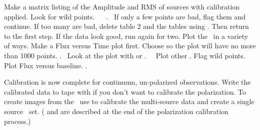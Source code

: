 \begin{description}
 Make a matrix listing of the Amplitude and RMS
   of  sources with calibration applied.  Look for
   wild points.~
~
.~
If only a few points are bad, flag them and continue.
If too many are bad, delete \CL table 2 and the \SN
tables using .
Then return to the first  step.
If the data look good, run  again for \IF two.
 Plot the \uvdata\ in a variety of ways.  Make a Flux
versus Time plot first.  Choose  so the plot will have no
more than 1000 points.
.~
Look at the plot with  or .~~
Plot other \IF. Flag wild points. Plot Flux versus baseline.
.
\eeddes

Calibration is now complete for continuum, un-polarized observations.
Write the calibrated data to tape with  if you don't want
to calibrate the polarization.  To create images from the \uvdata\ use
 to calibrate the multi-source data and create a single
source \uvdata\ set.  ( and  are described
at the end of the polarization calibration process.)


\end{description}
